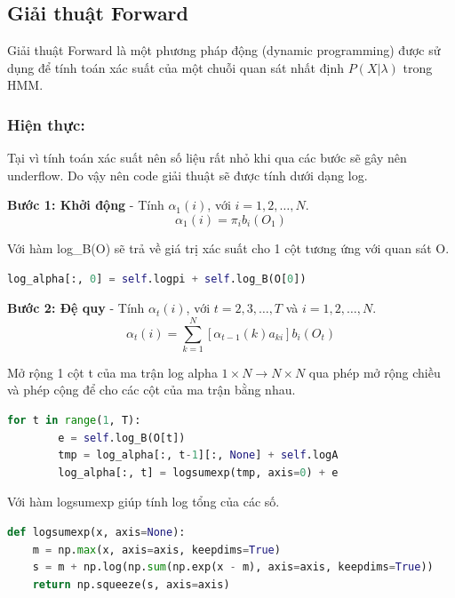 \documentclass[twoside, final]{hcmut_report}
\begin{document}
\subsection{Giải thuật Forward}
Giải thuật Forward là một phương pháp động (dynamic programming) được sử dụng để tính toán xác suất của một chuỗi quan sát nhất định \(P(X|\lambda) \) trong HMM.
\subsubsection*{Hiện thực:}
Tại vì tính toán xác suất nên số liệu rất nhỏ khi qua các bước sẽ gây nên underflow. Do vậy nên code giải thuật sẽ được tính dưới dạng log.

\textbf{Bước 1: Khởi động} - Tính $\alpha_1(i)$, với $i = 1, 2, \ldots, N$.
\begin{equation}
\alpha_1(i) = \pi_i b_i(O_1) \tag{2.2}
\end{equation}

Với hàm log\_B(O) sẽ trả về giá trị xác suất cho 1 cột tương ứng với quan sát O.

\begin{tcolorbox}
\begin{lstlisting}[language=Python]
        log_alpha[:, 0] = self.logpi + self.log_B(O[0])
\end{lstlisting}
\end{tcolorbox}

\textbf{Bước 2: Đệ quy} - Tính $\alpha_t(i)$, với $t = 2, 3, \ldots, T$ và $i = 1, 2, \ldots, N$.
\begin{equation}
\alpha_t(i) = \sum_{k=1}^{N} \left[\alpha_{t-1}(k) a_{ki}\right] b_i(O_t) \tag{2.3}
\end{equation}

Mở rộng 1 cột t của ma trận log alpha \(1 \times N \rightarrow N \times N\) qua phép mở rộng chiều và phép cộng để cho các cột của ma trận bằng nhau.

\begin{tcolorbox}
\begin{lstlisting}[language=Python]
    for t in range(1, T):
        e = self.log_B(O[t])
        tmp = log_alpha[:, t-1][:, None] + self.logA
        log_alpha[:, t] = logsumexp(tmp, axis=0) + e
\end{lstlisting}
\end{tcolorbox}

Với hàm logsumexp giúp tính log tổng của các số.

\begin{tcolorbox}
\begin{lstlisting}[language=Python]
def logsumexp(x, axis=None):
    m = np.max(x, axis=axis, keepdims=True)
    s = m + np.log(np.sum(np.exp(x - m), axis=axis, keepdims=True))
    return np.squeeze(s, axis=axis)
\end{lstlisting}
\end{tcolorbox}
\end{document}
